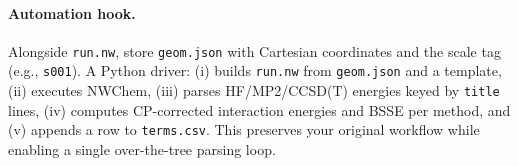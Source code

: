 \paragraph{Automation hook.}
Alongside \texttt{run.nw}, store \texttt{geom.json} with Cartesian coordinates and the scale tag (e.g., \texttt{s001}).
A Python driver:
(i) builds \texttt{run.nw} from \texttt{geom.json} and a template,
(ii) executes NWChem,
(iii) parses HF/MP2/CCSD(T) energies keyed by \texttt{title} lines,
(iv) computes CP-corrected interaction energies and BSSE per method, and
(v) appends a row to \texttt{terms.csv}.
This preserves your original workflow while enabling a single over-the-tree parsing loop.

